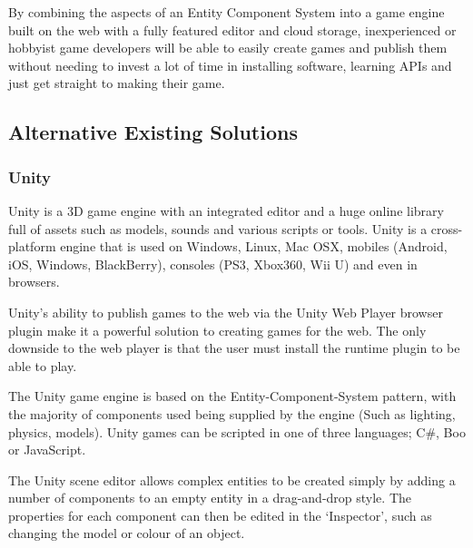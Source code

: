 \documentclass[a4paper, 12pt]{article}
\begin{document}



By combining the aspects of an Entity Component System into a game engine built on the web with a fully featured editor and cloud storage, inexperienced or hobbyist game developers will be able to easily create games and publish them without needing to invest a lot of time in installing software, learning APIs and just get straight to making their game.

\subsection{Alternative Existing Solutions}
\subsubsection{Unity}
Unity is a 3D game engine with an integrated editor and a huge online library full of assets such as models, sounds and various scripts or tools. Unity is a cross-platform engine that is used on Windows, Linux, Mac OSX, mobiles (Android, iOS, Windows, BlackBerry), consoles (PS3, Xbox360, Wii U) and even in browsers.


Unity's ability to publish games to the web via the Unity Web Player browser plugin make it a powerful solution to creating games for the web. The only downside to the web player is that the user must install the runtime plugin to be able to play.


The Unity game engine is based on the Entity-Component-System pattern, with the majority of components used being supplied by the engine (Such as lighting, physics, models). Unity games can be scripted in one of three languages; C\#, Boo or JavaScript.


The Unity scene editor allows complex entities to be created simply by adding a number of components to an empty entity in a drag-and-drop style. The properties for each component can then be edited in the `Inspector', such as changing the model or colour of an object. 
\end{document}
